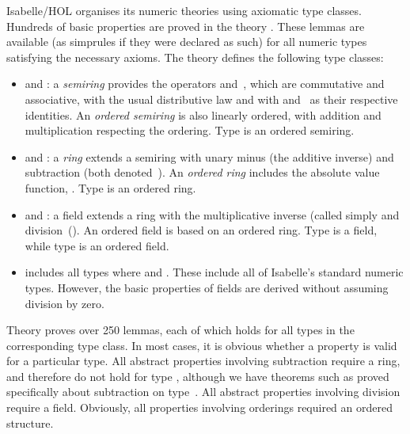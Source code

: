 Isabelle/HOL organises its numeric theories using axiomatic type classes.
Hundreds of basic properties are proved in the theory .
These lemmas are available (as simprules if they were declared as such)
for all numeric types satisfying the necessary axioms. The theory defines
the following type classes:
\begin{itemize}
\item 
{} and : a \emph{semiring}
provides the operators \isa{+} and~\isa{*}, which are commutative and
associative, with the usual distributive law and with  and~
as their respective identities. An \emph{ordered semiring} is also linearly
ordered, with addition and multiplication respecting the ordering. Type  is an ordered semiring.
\item 
{} and : a \emph{ring} extends a semiring
with unary minus (the additive inverse) and subtraction (both
denoted~\isa{-}). An \emph{ordered ring} includes the absolute value
function, . Type  is an ordered ring.
\item 
{} and : a field extends a ring with the
multiplicative inverse (called simply  and division~(\isa{/}).
An ordered field is based on an ordered ring. Type  is a field, while type  is an ordered field.
\item 
{} includes all types where 
and . These include all of Isabelle's standard numeric types.
However, the basic properties of fields are derived without assuming
division by zero.
\end{itemize}

Theory  proves over 250 lemmas, each of which
holds for all types in the corresponding type class. In most
cases, it is obvious whether a property is valid for a particular type. All
abstract properties involving subtraction require a ring, and therefore do
not hold for type , although we have theorems such as
 proved specifically about subtraction on
type~. All abstract properties involving division require a field.
Obviously, all properties involving orderings required an ordered
structure.

